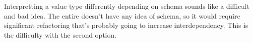Interpretting a value type differently depending on schema sounds like a
difficult and bad idea.  The entire  doesn't have any
idea of schema, so it would require significant refactoring that's probably
going to increase interdependency.  This is the difficulty with the second
option.
